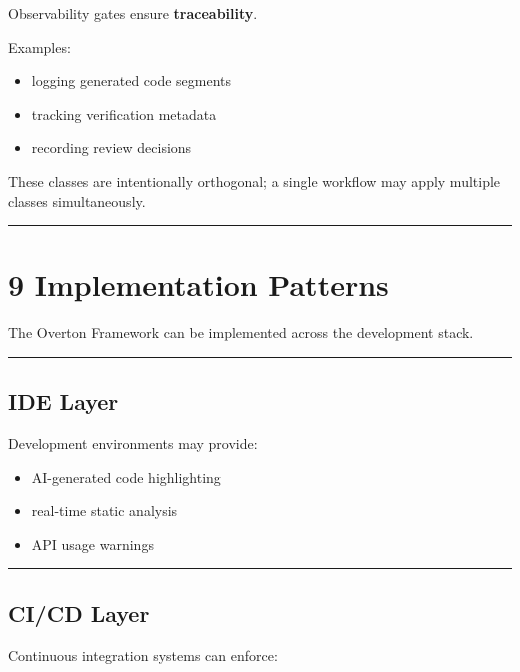 \documentclass[
]{article}
\providecommand{\tightlist}{%
  \setlength{\itemsep}{0pt}\setlength{\parskip}{0pt}}
\begin{document}
Observability gates ensure \textbf{traceability}.

Examples:

\begin{itemize}
\tightlist
\item
  logging generated code segments
\item
  tracking verification metadata
\item
  recording review decisions
\end{itemize}

These classes are intentionally orthogonal; a single workflow may apply
multiple classes simultaneously.

\begin{center}\rule{0.5\linewidth}{0.5pt}\end{center}

\section{9 Implementation Patterns}\label{9-implementation-patterns}

The Overton Framework can be implemented across the development stack.

\begin{center}\rule{0.5\linewidth}{0.5pt}\end{center}

\subsection{IDE Layer}\label{ide-layer}

Development environments may provide:

\begin{itemize}
\tightlist
\item
  AI-generated code highlighting
\item
  real-time static analysis
\item
  API usage warnings
\end{itemize}

\begin{center}\rule{0.5\linewidth}{0.5pt}\end{center}

\subsection{CI/CD Layer}\label{cicd-layer}

Continuous integration systems can enforce:
\end{document}
